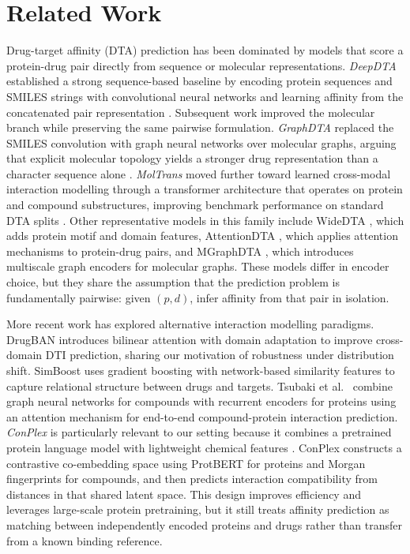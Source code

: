 \section{Related Work}

Drug-target affinity (DTA) prediction has been dominated by models that score a protein-drug pair directly from sequence or molecular representations. \emph{DeepDTA} established a strong sequence-based baseline by encoding protein sequences and SMILES strings \cite{weininger1988smiles} with convolutional neural networks and learning affinity from the concatenated pair representation \cite{ozturk2018deepdta}. Subsequent work improved the molecular branch while preserving the same pairwise formulation. \emph{GraphDTA} replaced the SMILES convolution with graph neural networks over molecular graphs, arguing that explicit molecular topology yields a stronger drug representation than a character sequence alone \cite{nguyen2021graphdta}. \emph{MolTrans} moved further toward learned cross-modal interaction modelling through a transformer architecture that operates on protein and compound substructures, improving benchmark performance on standard DTA splits \cite{huang2021moltrans}. Other representative models in this family include WideDTA \cite{ozturk2019widedta}, which adds protein motif and domain features, AttentionDTA \cite{zhao2023attentiondta}, which applies attention mechanisms to protein-drug pairs, and MGraphDTA \cite{yang2022mgraphdta}, which introduces multiscale graph encoders for molecular graphs. These models differ in encoder choice, but they share the assumption that the prediction problem is fundamentally pairwise: given $(p,d)$, infer affinity from that pair in isolation.

More recent work has explored alternative interaction modelling paradigms. DrugBAN \cite{bai2023drugban} introduces bilinear attention with domain adaptation to improve cross-domain DTI prediction, sharing our motivation of robustness under distribution shift. SimBoost \cite{he2017simboost} uses gradient boosting with network-based similarity features to capture relational structure between drugs and targets. Tsubaki et al.\ \cite{tsubaki2019compound} combine graph neural networks for compounds with recurrent encoders for proteins using an attention mechanism for end-to-end compound-protein interaction prediction. \emph{ConPlex} is particularly relevant to our setting because it combines a pretrained protein language model with lightweight chemical features \cite{singh2023conplex}. ConPlex constructs a contrastive co-embedding space using ProtBERT \cite{elnaggar2022prottrans} for proteins and Morgan fingerprints \cite{rogers2010morgan} for compounds, and then predicts interaction compatibility from distances in that shared latent space. This design improves efficiency and leverages large-scale protein pretraining, but it still treats affinity prediction as matching between independently encoded proteins and drugs rather than transfer from a known binding reference.

